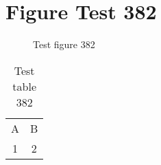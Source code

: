 \documentclass{article}
\begin{document}
\section{Figure Test 382}
\begin{figure}[h]
\caption{Test figure 382}
\end{figure}
\begin{table}[h]
\caption{Test table 382}
\begin{tabular}{cc}
A & B \\
1 & 2
\end{tabular}
\end{table}
\end{document}
